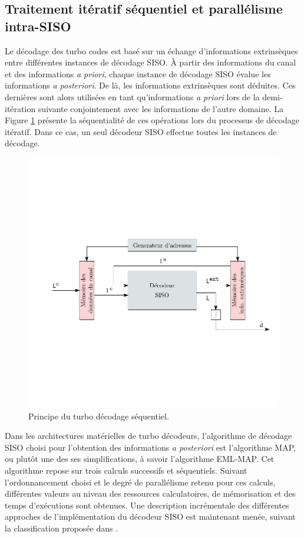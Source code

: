 \subsection{Traitement itératif séquentiel et parallélisme intra-SISO}
Le décodage des turbo codes est basé sur un échange d'informations extrinsèques entre différentes instances de décodage SISO. À partir 
des informations du canal et des informations \textit{a priori}, chaque instance de décodage SISO évalue les informations 
\textit{a posteriori}. De là, les informations extrinsèques sont déduites. Ces dernières sont alors utilisées en tant
qu'informations \textit{a priori} lors de la demi-itération suivante conjointement avec les informations de l'autre
domaine. La Figure \ref{fig:turbo_seq} présente la séquentialité de ces opérations lors du processus de décodage
itératif. Dans ce cas, un seul décodeur SISO effectue toutes les instances de décodage.
\vspace*{-1em}
\begin{figure}[!h]
	\centering
	\includegraphics{main/ch4_fig/ipe/serial.pdf}
	\caption{Principe du turbo décodage séquentiel. \label{fig:turbo_seq}}
\end{figure} 
\vspace*{-1em}

Dans les architectures matérielles de turbo décodeurs, l'algorithme de décodage SISO choisi pour l’obtention des informations \textit{a posteriori} est l'algorithme MAP, 
ou plutôt une des ses simplifications, à savoir l'algorithme EML-MAP. Cet algorithme repose sur trois calculs successifs et 
séquentiels. Suivant l'ordonnancement choisi et le degré de parallélisme retenu pour ces calculs, différentes valeurs 
au niveau des ressources calculatoires, de mémorisation et des temps d'exécutions sont obtenues. Une description
incrémentale des différentes approches de l'implémentation du décodeur SISO est maintenant menée, suivant la 
classification proposée dans \cite{Muller2010}.
\vspace*{-1em}

